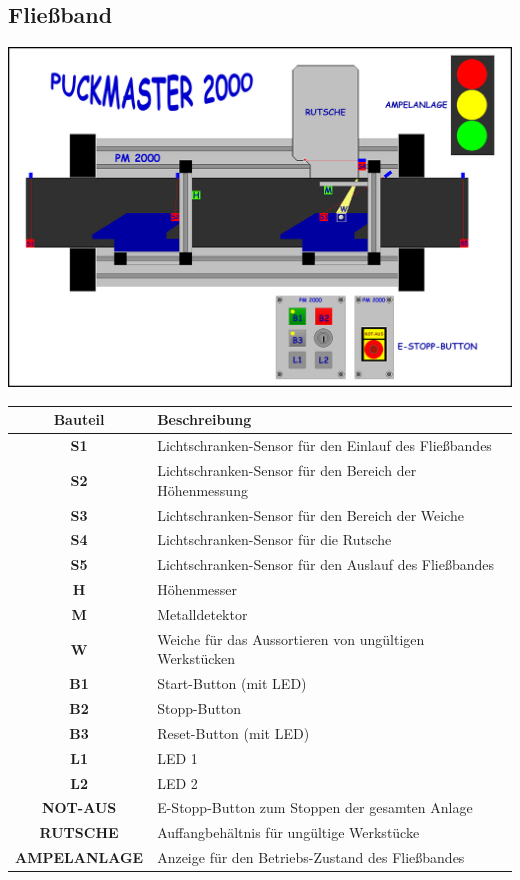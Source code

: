 \documentclass[oneside,a4paper,titlepage]{scrartcl} %
\begin{document}
\subsection{Fließband}
\includegraphics[scale=0.86]{imgs/PUCKMASTER_2000.png}
\newline
\newline
\begin{small}
  \begin{tabular}{|c|L{10.5cm}|}
    \hline
    \textbf{Bauteil} & \textbf{Beschreibung}\\
    \hline
    \textbf{S1} & Lichtschranken-Sensor für den Einlauf des Fließbandes\\
    \hline
    \textbf{S2} & Lichtschranken-Sensor für den Bereich der Höhenmessung\\
    \hline
    \textbf{S3} & Lichtschranken-Sensor für den Bereich der Weiche\\
    \hline
    \textbf{S4} & Lichtschranken-Sensor für die Rutsche\\
    \hline
    \textbf{S5} & Lichtschranken-Sensor für den Auslauf des Fließbandes\\
    \hline
    \textbf{H} & Höhenmesser\\
    \hline
    \textbf{M} & Metalldetektor\\
    \hline
    \textbf{W} & Weiche für das Aussortieren von ungültigen Werkstücken\\
    \hline
    \textbf{B1} & Start-Button (mit LED)\\
    \hline
    \textbf{B2} & Stopp-Button\\
    \hline
    \textbf{B3} & Reset-Button (mit LED)\\
    \hline
    \textbf{L1} & LED 1\\
    \hline
    \textbf{L2} & LED 2\\
    \hline
    \textbf{NOT-AUS} & E-Stopp-Button zum Stoppen der gesamten Anlage\\
    \hline
    \textbf{RUTSCHE} & Auffangbehältnis für ungültige Werkstücke\\
    \hline
    \textbf{AMPELANLAGE} & Anzeige für den Betriebs-Zustand des Fließbandes\\
    \hline
  \end{tabular}
\end{small}
\end{document}
